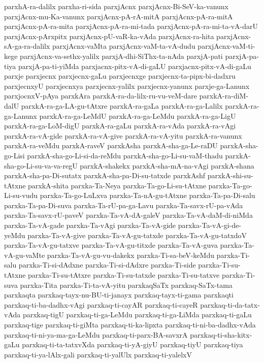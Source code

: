 {parxhA-ra-dalilx
parxha-ri-sida
parxjAcnx
parxjAcnx-Bi-SeV-ka-vanunx
parxjAcnx-mu-Ka-vanunx
parxjAcnx-pA-rA-mitA
parxjAcnx-pA-ra-mitA
parxjAcnx-pA-ra-mita
parxjAcnx-pA-ra-mi-tada
parxjAcnx-pA-ra-mi-ta-vA-darU
parxjAcnx-pArxpitx
parxjAcnx-pU-vaR-ka-vAda
parxjAcnx-ra-hita
parxjAcnx-sA-ga-ra-dalilx
parxjAcnx-vaMta
parxjAcnx-vaM-ta-vA-dudu
parxjAcnx-vaM-ti-kege
parxjAcnx-va-sethx-yalilx
parxjA-dhi-SiThx-ta-nAda
parxjA-pati
parxjA-pa-tiya
parxjA-pa-ti-yiMda
parxjacnx-pitx-vA-di-gaLU
parxjacnx-pitx-vA-di-gaLu
parxje
parxjecnx
parxjecnx-gaLu
parxjecnxge
parxjecnx-ta-pipx-bi-dadxru
parxjecnxyU
parxjecnxya
parxjecnx-yalilx
parxjecnx-yanunx
parxje-ga-Lanunx
parxjocnxV-pAya
parxkAra
parxkA-ra-da-lilx-ru-vu-veM-dare
parxkA-ra-diM-dalU
parxkA-ra-ga-LA-gu-tAtxre
parxkA-ra-gaLa
parxkA-ra-ga-Lalilx
parxkA-ra-ga-Lanunx
parxkA-ra-ga-LeMdU
parxkA-ra-ga-LeMdu
parxkA-ra-ga-LigU
parxkA-ra-ga-LoM-digU
parxkA-ra-gaLu
parxkA-ra-vAda
parxkA-ra-vAgi
parxkA-ra-vA-gide
parxkA-ra-vA-give
parxkA-ra-vA-yitu
parxkA-ra-vanunx
parxkA-ra-veMdu
parxkA-raveV
parxkAsha
parxkA-sha-ga-Le-raDU
parxkA-sha-go-Lisi
parxkA-sha-go-Li-si-da-reMdu
parxkA-sha-go-Li-su-vaM-thadu
parxkA-sha-go-Li-su-va-va-regU
parxkA-shakekx
parxkA-sha-mA-na-vAgi
parxkA-shana
parxkA-sha-pa-Di-sutatx
parxkA-sha-pa-Di-su-tatxde
parxkAshf
parxkA-shi-su-tAtxne
parxkA-shita
parxka-Ta-Neya
parxka-Ta-go-Li-su-tAtxne
parxka-Ta-go-Li-su-vudu
parxka-Ta-go-LuLxva
parxka-Ta-nA-gu-tAtxne
parxka-Ta-pa-Di-salu
parxka-Ta-pa-Di-suva
parxka-Ta-rU-pa-ga-Lavu
parxka-Ta-savx-rU-pa-vAda
parxka-Ta-savx-rU-paveV
parxka-Ta-vA-dA-galeV
parxka-Ta-vA-daM-di-niMda
parxka-Ta-vA-gade
parxka-Ta-vAgi
parxka-Ta-vA-gide
parxka-Ta-vA-gi-de-yeMdu
parxka-Ta-vA-give
parxka-Ta-vA-gu-tatxde
parxka-Ta-vA-gu-tatxdoV
parxka-Ta-vA-gu-tatxve
parxka-Ta-vA-gu-titxde
parxka-Ta-vA-guva
parxka-Ta-vA-gu-vaMte
parxka-Ta-vA-gu-vu-dakekx
parxka-Ti-sa-beV-keMdu
parxka-Ti-salu
parxka-Ti-si-dAdxne
parxka-Ti-si-dAdxre
parxka-Ti-side
parxka-Ti-su-tAtxne
parxka-Ti-su-tAtxre
parxka-Ti-su-tatxde
parxka-Ti-su-tatxve
parxka-Ti-suva
parxka-Tita
parxka-Ti-ta-vA-yitu
parxkaqSaTx
parxkaq-SaTx-tama
parxkaqta
parxkaq-tayx-nu-BU-ti-janayx
parxkaq-tayx-ti-gama
parxkaqti
parxkaq-ti-ba-dadhx-vAgi
parxkaq-ti-cayAR
parxkaq-ti-cayeR
parxkaq-ti-da-tatx-vAda
parxkaq-tigU
parxkaq-ti-ga-LeMdu
parxkaq-ti-ga-LiMda
parxkaq-ti-gaLu
parxkaq-tige
parxkaq-ti-giMta
parxkaq-ti-ka-lipxta
parxkaq-ti-ni-ba-dadhx-vAda
parxkaq-ti-ni-ya-ma-ga-LeMdu
parxkaq-ti-parx-BA-savxrA
parxkaq-ti-sha-kitx-gaLu
parxkaq-ti-ta-tatxvXda
parxkaq-ti-yA-giyU
parxkaq-tiyU
parxkaq-tiya
parxkaq-ti-ya-lAlx-gali
parxkaq-ti-yalUlx
parxkaq-ti-yalelxV
}
